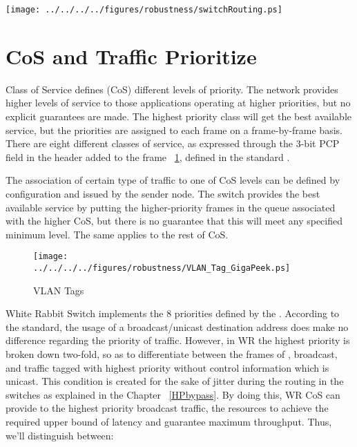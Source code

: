 \begin{center}
	\texttt{[image: ../../../../figures/robustness/switchRouting.ps]}
	\label{fig:swRouting}
\end{center}

\section{CoS and Traffic Prioritize}
\label{chapter:cos}

Class of Service defines (CoS) different levels of priority. The network
provides higher levels of service to those applications operating at higher
priorities, but no explicit guarantees are made. The highest priority
class will get the best available service, but the priorities are assigned to
each frame on a frame-by-frame basis. There are eight different classes of
service, as expressed through the 3-bit PCP field in the header added to the
frame ~\ref{fig:VLAN_Tag}, defined in the standard \cite{IEEE8021Q}.


The association of certain type of traffic to one of CoS levels can be defined
by configuration and issued by the sender node. The switch provides the best
available service by putting the higher-priority frames in the queue associated
with the higher CoS, but there is no guarantee that this will meet any specified
minimum level. The same applies to the rest of CoS. 

\begin{figure}[!ht]
 \centering
		\texttt{[image: ../../../../figures/robustness/VLAN\_Tag\_GigaPeek.ps]}
 \caption{VLAN Tags}
	\label{fig:VLAN_Tag}
\end{figure}


White Rabbit Switch implements the 8 priorities defined by the \cite{IEEE8021Q}.
According to the standard, the usage of a broadcast/unicast destination address
does make no difference regarding the priority of traffic. However, in WR the
highest priority is broken down two-fold, so as to differentiate between the
frames of \ControlMessage, broadcast, and traffic tagged with highest priority
without control information which is unicast. This condition
is created for the sake of jitter during the routing in the
switches as explained in the Chapter ~\ref{HPbypass}. By doing this, WR CoS can
provide to the highest priority broadcast traffic, the resources to
achieve the required upper bound of latency and guarantee maximum throughput.
Thus, we'll distinguish between:

